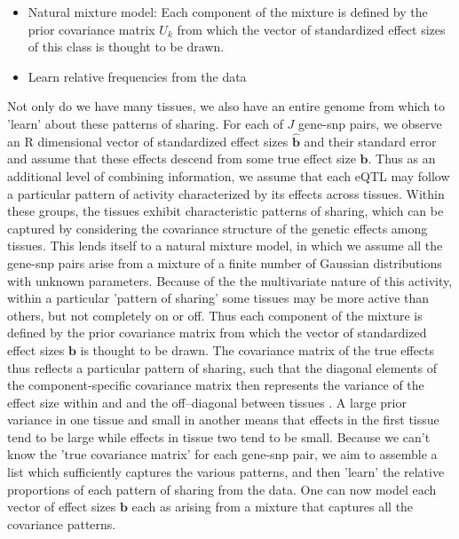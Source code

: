 \documentclass[10pt,letterpaper]{article}
\begin{document}
\begin{itemize}
\item Natural mixture model: Each component of the mixture is defined by the prior covariance matrix $U_{k}$ from which the vector of standardized effect sizes of this class is thought to be drawn. 
\item Learn relative frequencies from the data
\end{itemize}%


Not only do we have many tissues, we also have an entire genome from which to 'learn' about these patterns of sharing.  For each of $J$ gene-snp pairs, we observe an R dimensional vector of standardized effect sizes $\bm\hat{b}$ and their standard error and assume that these effects descend from some true effect size $\bm{b}$. Thus as an additional level of combining information, we assume that each eQTL may follow a particular pattern of activity characterized by its effects across tissues. Within these groups, the tissues exhibit characteristic patterns of sharing, which can be captured by considering the covariance structure of the genetic effects among tissues. This lends itself to a natural mixture model, in which  we assume all the gene-snp pairs arise from a mixture of a finite number of Gaussian distributions with unknown parameters. Because of the the multivariate nature of this activity, within a particular 'pattern of sharing' some tissues may be more active than others, but not completely on or off. Thus each component of the mixture is defined by the prior covariance matrix from which the vector of standardized effect sizes $\bm{b}$ is thought to be drawn. The covariance matrix of the true effects thus reflects a particular pattern of sharing, such that the diagonal elements of the component-specific covariance matrix then represents the variance of the effect size within and and the off--diagonal between tissues . A large prior variance in one tissue and small in another means that effects in the first tissue tend to be large while effects in tissue two tend to be small. Because we can't know the 'true covariance matrix' for each gene-snp pair, we aim to assemble a list which sufficiently captures the various patterns, and then 'learn' the relative proportions of each pattern of sharing from the data. One can now model each vector of effect sizes $\bm{b}$ each as arising from a mixture that captures all the covariance patterns.
\end{document}
